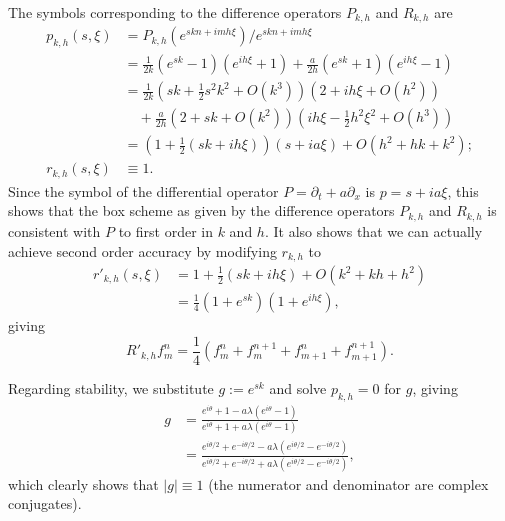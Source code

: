 \documentclass{article}
\providecommand{\abs}[1]{\left\lvert#1\right\rvert}
\begin{document}
\begin{itemize}
The symbols corresponding to the difference operators $P_{k,h}$ and $R_{k,h}$ are
\begin{align*}
p_{k,h}(s,\xi) & = P_{k,h} \left( e^{skn + imh\xi} \right) / e^{skn + imh\xi} \\
               & = \frac{1}{2k} \left( e^{sk} - 1 \right) \left( e^{ih\xi} + 1 \right) + \frac{a}{2h} \left( e^{sk} + 1 \right) \left( e^{ih\xi} - 1 \right) \\
               & = \frac{1}{2k} \left( sk + \frac{1}{2} s^2 k^2 + O \left( k^3 \right) \right) \left( 2 + i h \xi + O \left( h^2 \right) \right) \\
               & \quad {} + \frac{a}{2h} \left( 2 + sk + O \left( k^2 \right) \right) \left( ih\xi - \frac{1}{2} h^2 \xi^2 + O \left( h^3 \right) \right) \\
               & = \left( 1 + \frac{1}{2} \left( sk + ih\xi \right) \right) \left( s + ia\xi \right) + O \left( h^2 + h k + k^2 \right); \\
r_{k,h}(s,\xi) & \equiv 1.
\end{align*}
Since the symbol of the differential operator $P = \partial_t + a \partial_x$ is $p = s + ia\xi$, this shows that the box scheme as given by the difference operators $P_{k,h}$ and $R_{k,h}$ is consistent with $P$ to first order in $k$ and $h$. It also shows that we can actually achieve second order accuracy by modifying $r_{k,h}$ to
\begin{align*}
r'_{k,h}(s,\xi) & = 1 + \frac{1}{2} \left( sk + ih\xi \right) + O \left( k^2 + k h + h^2 \right) \\
                & = \frac{1}{4} \left( 1 + e^{sk} \right) \left( 1 + e^{ih\xi} \right),
\end{align*}
giving
\begin{equation*}
R'_{k,h} f^n_m = \frac{1}{4} \left( f^n_m + f^{n+1}_m + f^n_{m+1} + f^{n+1}_{m+1} \right).
\end{equation*}

Regarding stability, we substitute $g := e^{sk}$ and solve $p_{k,h} = 0$ for $g$, giving
\begin{align*}
g & = \frac{e^{i \theta} + 1 - a \lambda \left( e^{i\theta} - 1 \right)}{e^{i\theta} + 1 + a\lambda \left( e^{i\theta} - 1 \right)} \\
  & = \frac{e^{i\theta/2} + e^{-i\theta/2} - a \lambda \left( e^{i\theta/2} - e^{-i\theta/2} \right)}{e^{i\theta/2} + e^{-i\theta/2} + a \lambda \left( e^{i\theta/2} - e^{-i\theta/2} \right)},
\end{align*}
which clearly shows that $\abs{g} \equiv 1$ (the numerator and denominator are complex conjugates).


\end{itemize}
\end{document}
